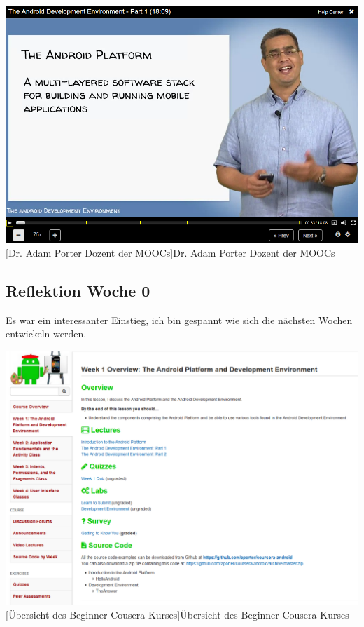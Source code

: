 \documentclass[12pt,a4paper,bibliography=totocnumbered,listof=totocnumbered]{scrartcl}
\begin{document}
\vspace{1em}
\begin{minipage}{\linewidth}
	\centering
	\includegraphics[width=0.7\linewidth]{Bilder/dozent.png}
	[Dr. Adam Porter Dozent der MOOCs]{Dr. Adam Porter Dozent der MOOCs\footnotemark }
	\label{fig:osgi}
\end{minipage}

\pagebreak
\subsection{Reflektion Woche 0}
Es war ein interessanter Einstieg, ich bin gespannt wie sich die nächsten Wochen entwickeln werden. 

\vspace{1em}
\begin{minipage}{\linewidth}
	\centering
	\includegraphics[width=1\linewidth]{Bilder/wochenplan.png}
	[Übersicht des Beginner Cousera-Kurses]{Übersicht des Beginner Cousera-Kurses\footnotemark }
	\label{fig:osgi}
\end{minipage}
\end{document}
